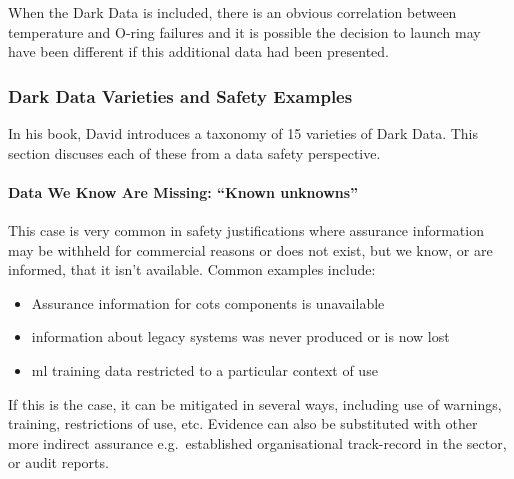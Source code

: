 When the Dark Data is included, there is an obvious correlation between temperature and O-ring failures and it is possible the decision to launch may have been different if this additional data had been presented.

\subsubsection{Dark Data Varieties and Safety Examples}
In his book, David introduces a taxonomy of 15 varieties of Dark Data. This section discuses each of these from a data safety perspective.

\paragraph{Data We Know Are Missing: ``Known unknowns''}\label{bkm:dark1}

This case is very common in safety justifications where assurance \gls{information} may be withheld for commercial reasons or does not exist, but we know, or are informed, that it isn’t available. Common examples include:
\begin{itemize}
  \item Assurance \gls{information} for \gls{cots} components is unavailable
  \item \Gls{information} about legacy systems was never produced or is now lost
  \item \Gls{ml} training data restricted to a particular context of use
\end{itemize}
    If this is the case, it can be mitigated in several ways, including use of warnings, training, restrictions of use, etc. Evidence can also be substituted with other more indirect assurance e.g.\ established organisational track-record in the sector, or audit reports.
    
